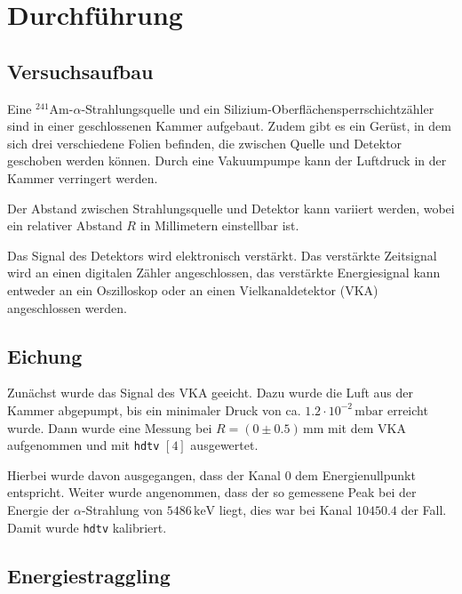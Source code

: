 \documentclass[12pt,a4paper]{scrartcl}
\numberwithin{equation}{section} %
\renewcommand{\[}{} %
\renewcommand{\]}{\noindent} %
\begin{document}
\hypertarget{durchfuxfchrung}{%
\section{Durchführung}\label{durchfuxfchrung}}

\hypertarget{versuchsaufbau}{%
\subsection{Versuchsaufbau}\label{versuchsaufbau}}

Eine \(^{241}\mathrm{Am}\)-\(\alpha\)-Strahlungsquelle und ein
Silizium-Oberflächensperrschichtzähler sind in einer geschlossenen
Kammer aufgebaut. Zudem gibt es ein Gerüst, in dem sich drei
verschiedene Folien befinden, die zwischen Quelle und Detektor geschoben
werden können. Durch eine Vakuumpumpe kann der Luftdruck in der Kammer
verringert werden.

Der Abstand zwischen Strahlungsquelle und Detektor kann variiert werden,
wobei ein relativer Abstand \(R\) in Millimetern einstellbar ist.

Das Signal des Detektors wird elektronisch verstärkt. Das verstärkte
Zeitsignal wird an einen digitalen Zähler angeschlossen, das verstärkte
Energiesignal kann entweder an ein Oszilloskop oder an einen
Vielkanaldetektor (VKA) angeschlossen werden.

\hypertarget{eichung}{%
\subsection{Eichung}\label{eichung}}

Zunächst wurde das Signal des VKA geeicht. Dazu wurde die Luft aus der
Kammer abgepumpt, bis ein minimaler Druck von ca.
\(1.2\cdot10^{-2}\mathrm{\,mbar}\) erreicht wurde. Dann wurde eine
Messung bei \(R=(0\pm0.5)\mathrm{\,mm}\) mit dem VKA aufgenommen und mit
\texttt{hdtv} \([4]\) ausgewertet.

Hierbei wurde davon ausgegangen, dass der Kanal \(0\) dem
Energienullpunkt entspricht. Weiter wurde angenommen, dass der so
gemessene Peak bei der Energie der \(\alpha\)-Strahlung von
\(5486\mathrm{\,keV}\) liegt, dies war bei Kanal \(10450.4\) der Fall.
Damit wurde \texttt{hdtv} kalibriert.

\hypertarget{energiestraggling}{%
\subsection{Energiestraggling}\label{energiestraggling}}
\end{document}
